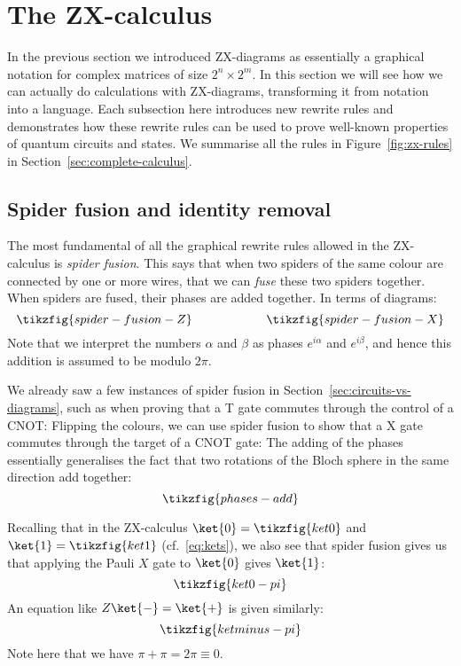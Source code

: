 \documentclass[a4paper,onecolumn,superscriptaddress,11pt,%
				unpublished,%
				allowfontchageintitle,%
				]{quantumarticle}
\begin{document}
\section{The ZX-calculus}\label{sec:zx-calculus}
In the previous section we introduced ZX-diagrams as essentially a graphical notation for complex matrices of size $2^n\times 2^m$. In this section we will see how we can actually do calculations with ZX-diagrams, transforming it from notation into a language. Each subsection here introduces new rewrite rules and demonstrates how these rewrite rules can be used to prove well-known properties of quantum circuits and states. We summarise all the rules in Figure~\ref{fig:zx-rules} in Section~\ref{sec:complete-calculus}.

\subsection{Spider fusion and identity removal}

The most fundamental of all the graphical rewrite rules allowed in the ZX-calculus is \emph{spider fusion}. This says that when two spiders of the same colour are connected by one or more wires, that we can \emph{fuse} these two spiders together. When spiders are fused, their phases are added together. In terms of diagrams:
\begin{equation}\label{eq:spider-fusion}
\tikzfig{spider-fusion-Z} \qquad\qquad\qquad
\tikzfig{spider-fusion-X}
\end{equation}
Note that we interpret the numbers $\alpha$ and $\beta$ as phases $e^{i\alpha}$ and $e^{i\beta}$, and hence this addition is assumed to be modulo $2\pi$.

We already saw a few instances of spider fusion in Section~\ref{sec:circuits-vs-diagrams}, such as when proving that a T gate commutes through the control of a CNOT:
Flipping the colours, we can use spider fusion to show that a X gate commutes through the  target of a CNOT gate:
The adding of the phases essentially generalises the fact that two rotations of the Bloch sphere in the same direction add together:
\begin{equation}\label{eq:phases-add}
\tikzfig{phases-add}
\end{equation}

Recalling that in the ZX-calculus $\ket{0} = \tikzfig{ket0}$ and $\ket{1} = \tikzfig{ket1}$ (cf.~\eqref{eq:kets}), we also see that spider fusion gives us that applying the Pauli $X$ gate to $\ket{0}$ gives $\ket{1}$:
\begin{equation}
\tikzfig{ket0-pi}
\end{equation}
An equation like $Z\ket{-} = \ket{+}$ is given similarly:
\begin{equation}
\tikzfig{ketminus-pi}
\end{equation}
Note here that we have $\pi+\pi = 2\pi \equiv 0$.
\end{document}
